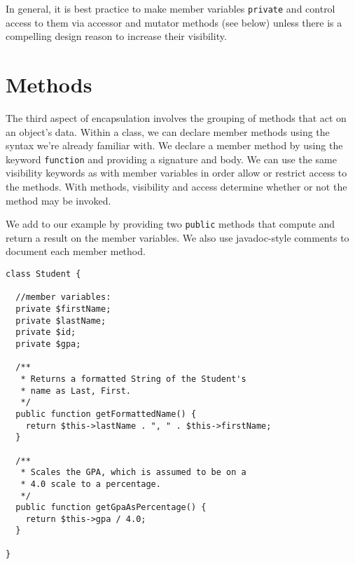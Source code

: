 In general, it is best practice to make member variables 
\texttt{private} and control access to them via accessor and
mutator methods (see below) unless there is a compelling design
reason to increase their visibility.

\section{Methods}

The third aspect of encapsulation involves the grouping of methods that
act on an object's data.  Within a class, we can declare member methods
using the syntax we're already familiar with.  We declare a member
method by using the keyword \texttt{function} and providing a signature and body.  We can use the same visibility
keywords as with member variables in order allow or restrict access
to the methods.  With methods, visibility and access determine whether 
or not the method may be invoked.


We add to our example by providing two \texttt{public}
methods that compute and return a result on the member variables.  
We also use javadoc-style comments to document each member method.

\begin{verbatim}
class Student {

  //member variables:
  private $firstName;
  private $lastName;
  private $id;
  private $gpa;

  /**
   * Returns a formatted String of the Student's
   * name as Last, First.
   */
  public function getFormattedName() {
    return $this->lastName . ", " . $this->firstName;
  }
  
  /**
   * Scales the GPA, which is assumed to be on a
   * 4.0 scale to a percentage.
   */
  public function getGpaAsPercentage() {
    return $this->gpa / 4.0;
  }
  
}
\end{verbatim}

